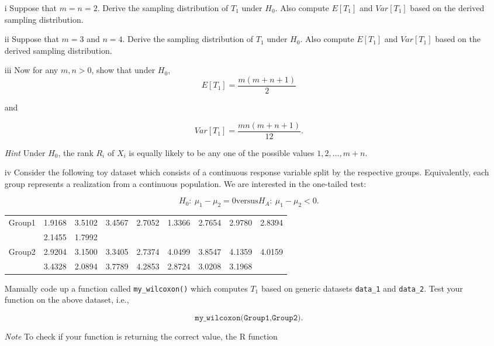\documentclass[letterpaper]{article}
\begin{document}
		\begin{enumerate}
			\item[i] Suppose that $m=n=2$. Derive the sampling distribution of $T_1$ under $H_0$. Also compute $E[T_1]$ and $Var[T_1]$ based on the derived sampling distribution.
			
			\item[ii] Suppose that $m=3$ and $n=4$. Derive the sampling distribution of $T_1$ under $H_0$. Also compute $E[T_1]$ and $Var[T_1]$ based on the derived sampling distribution.
			
			\item[iii] Now for any $m,n>0$, show that under $H_0$,
			\[
			E[T_1]=\frac{m(m+n+1)}{2}
			\]
			
			and
			
			\[
			Var[T_1]=\frac{mn(m+n+1)}{12}.
			\]
			
			\emph{Hint} Under $H_0$, the rank $R_i$ of $X_i$ is equally likely to be any one of the possible values $1,2,\dots,m+n$.
			
			\item[iv] Consider the following toy dataset which consists of a continuous response variable split by the respective groups. Equivalently, each group represents a realization from a continuous population. We are interested in the one-tailed test:
			
			\[
			H_0:\ \mu_1-\mu_2=0
			\text{versus} 
			H_A:\ \mu_1-\mu_2<0.
			\]
			
			\begin{center}
				\begin{tabular}{lcccccccc}
					Group1 & 1.9168 & 3.5102 & 3.4567 & 2.7052 & 1.3366 & 2.7654 & 2.9780 & 2.8394 \\
					& 2.1455 & 1.7992 \\
					\hline
					Group2 & 2.9204 & 3.1500 & 3.3405 & 2.7374 & 4.0499 & 3.8547 & 4.1359 & 4.0159 \\
					& 3.4328 & 2.0894 & 3.7789 & 4.2853 & 2.8724 & 3.0208 & 3.1968
				\end{tabular}
			\end{center}
			
			Manually code up a function called \texttt{my\_wilcoxon()} which computes $T_1$ based on generic datasets \texttt{data\_1} and \texttt{data\_2}. Test your function on the above dataset, i.e.,
			
			\[
			\texttt{my\_wilcoxon(Group1,Group2)}.
			\]
			
			\emph{Note} To check if your function is returning the correct value, the R function
			

\end{enumerate}
\end{document}
